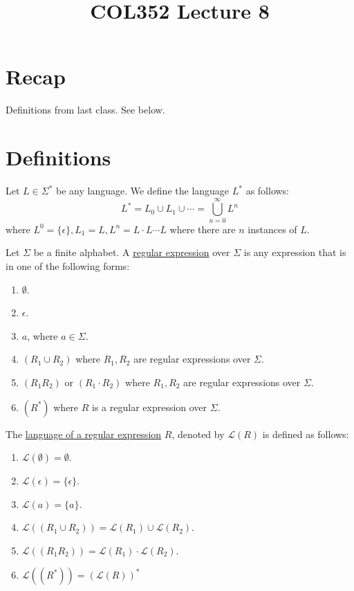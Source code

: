 \documentclass[a4paper]{article}
\title{\textbf{COL352 Lecture 8}}
\date{}
\newcommand{\mc}{\mathcal}
\renewcommand{\L}{\mc{L}}
\begin{document}
\maketitle
\tableofcontents

\section{Recap}

Definitions from last class. See below.

\section{Definitions}

\begin{defn}
    Let $L \in \Sigma^*$ be any language. We define the language $L^*$ as follows:
    \[
        L^* = L_0 \cup L_1 \cup \cdots = \bigcup_{n=0}^\infty L^n
    \]
    where $L^0 = \{\epsilon\}, L_1 = L, L^n = L\cdot L \cdots L$ where there are $n$ instances of $L$.
\end{defn}

\begin{defn}
    Let $\Sigma$ be a finite alphabet. A \underline{regular expression} over $\Sigma$ is any expression that is in one of the following forms:
    \begin{enumerate}
        \item $\emptyset$.
        \item $\epsilon$.
        \item $a$, where $a \in \Sigma$.
        \item $(R_1 \cup R_2)$ where $R_1, R_2$ are regular expressions over $\Sigma$.
        \item $(R_1R_2)$ or $(R_1 \cdot R_2)$ where $R_1, R_2$ are regular expressions over $\Sigma$.
        \item $(R^*)$ where $R$ is a regular expression over $\Sigma$.
    \end{enumerate}
\end{defn}

\begin{defn}
    The \underline{language of a regular expression} $R$, denoted by $\mc{L}(R)$ is defined as follows:
    \begin{enumerate}
        \item $\mc{L}(\emptyset) = \emptyset$.
        \item $\mc{L}(\epsilon) = \{\epsilon\}$.
        \item $\mc{L}(a) = \{a\}$.
        \item $\mc{L}((R_1 \cup R_2)) = \mc{L}(R_1) \cup \mc{L}(R_2)$.
        \item $\mc{L}((R_1R_2)) = \mc{L}(R_1) \cdot \L(R_2)$.
        \item $\mc{L}\left((R^*)\right) = \left(\mc{L}(R)\right)^*$
    \end{enumerate}
\end{defn}
\end{document}
